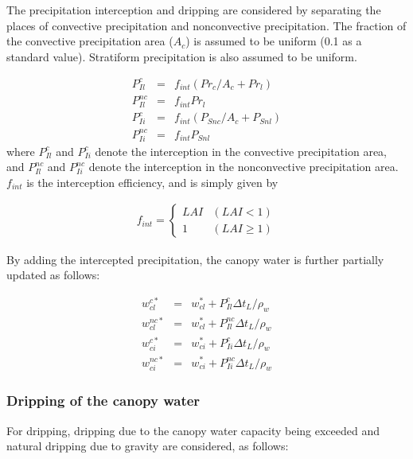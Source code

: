 The precipitation interception and dripping are considered by separating the places of convective precipitation and nonconvective precipitation. The fraction of the convective precipitation area
(\(A_c\)) is assumed to be uniform (0.1 as a standard value). Stratiform precipitation is also assumed to be uniform.

\begin{eqnarray}
 P_{Il}^{c}  &=& f_{int} ( Pr_c / A_c + Pr_l ) \\
 P_{Il}^{nc} &=& f_{int} Pr_l \\
 P_{Ii}^{c}  &=& f_{int} ( P_{Snc} / A_c + P_{Snl} ) \\
 P_{Ii}^{nc} &=& f_{int} P_{Snl}
\end{eqnarray} where \(P_{Il}^{c}\) and \(P_{Ii}^{c}\) denote the interception in the convective precipitation area, and \(P_{Il}^{nc}\) and \(P_{Ii}^{nc}\) denote the interception in the nonconvective
precipitation area. \(f_{int}\) is the interception efficiency, and is simply given by

\begin{eqnarray}
 f_{int} = \left\{
\begin{array}{ll}
 LAI  & (LAI < 1)\\
 1    & (LAI \geq 1)
\end{array}
\right.
\end{eqnarray}

By adding the intercepted precipitation, the canopy water is further partially updated as follows:

\begin{eqnarray}
 w_{cl}^{c*} &=& w_{cl}^\ast  + P_{Il}^c    \Delta t_L / \rho_w \\
 w_{cl}^{nc*}&=& w_{cl}^\ast  + P_{Il}^{nc} \Delta t_L / \rho_w \\
 w_{ci}^{c*} &=& w_{ci}^\ast  + P_{Ii}^c    \Delta t_L / \rho_w \\
 w_{ci}^{nc*}&=& w_{ci}^\ast  + P_{Ii}^{nc} \Delta t_L / \rho_w
\end{eqnarray}

\subsubsection{Dripping of the canopy water}\label{dripping-of-the-canopy-water}

For dripping, dripping due to the canopy water capacity being exceeded and natural dripping due to gravity are considered, as follows:

